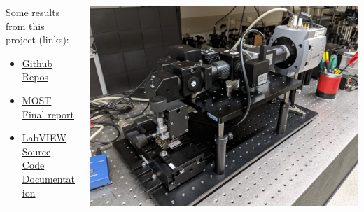\documentclass[compress]{beamer}
\begin{document}
\begin{frame}
    \begin{columns}
        \begin{column}{0.4\linewidth}
            Some results from this project (links):
            \begin{itemize}
                \item \href{https://github.com/HyperSpectral-Imaging}{Github Repos}
                \item \href{https://github.com/HyperSpectral-Imaging/HSI-docs/raw/main/final.pdf}{MOST Final report}
                \item \href{https://cheng-posheng.gitbook.io/hsi-main-project-api-documentation/}{LabVIEW Source Code Documentation}
            \end{itemize}
        \end{column}
        \begin{column}{0.6\linewidth}
            \includegraphics[width=\linewidth]{microSystemPixel3.jpg}
        \end{column}
    \end{columns}
\end{frame}
\end{document}
